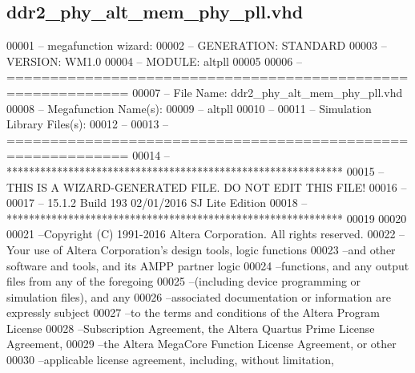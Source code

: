 \subsection{ddr2\+\_\+phy\+\_\+alt\+\_\+mem\+\_\+phy\+\_\+pll.\+vhd}
\label{ddr2__phy__alt__mem__phy__pll_8vhd_source}

\begin{DoxyCode}
00001 \textcolor{keyword}{-- megafunction wizard: %
00002 \textcolor{keyword}{-- GENERATION: STANDARD}
00003 \textcolor{keyword}{-- VERSION: WM1.0}
00004 \textcolor{keyword}{-- MODULE: altpll }
00005 
00006 \textcolor{keyword}{-- ============================================================}
00007 \textcolor{keyword}{-- File Name: ddr2\_phy\_alt\_mem\_phy\_pll.vhd}
00008 \textcolor{keyword}{-- Megafunction Name(s):}
00009 \textcolor{keyword}{--          altpll}
00010 \textcolor{keyword}{--}
00011 \textcolor{keyword}{-- Simulation Library Files(s):}
00012 \textcolor{keyword}{--          }
00013 \textcolor{keyword}{-- ============================================================}
00014 \textcolor{keyword}{-- ************************************************************}
00015 \textcolor{keyword}{-- THIS IS A WIZARD-GENERATED FILE. DO NOT EDIT THIS FILE!}
00016 \textcolor{keyword}{--}
00017 \textcolor{keyword}{-- 15.1.2 Build 193 02/01/2016 SJ Lite Edition}
00018 \textcolor{keyword}{-- ************************************************************}
00019 
00020 
00021 \textcolor{keyword}{--Copyright (C) 1991-2016 Altera Corporation. All rights reserved.}
00022 \textcolor{keyword}{--Your use of Altera Corporation's design tools, logic functions }
00023 \textcolor{keyword}{--and other software and tools, and its AMPP partner logic }
00024 \textcolor{keyword}{--functions, and any output files from any of the foregoing }
00025 \textcolor{keyword}{--(including device programming or simulation files), and any }
00026 \textcolor{keyword}{--associated documentation or information are expressly subject }
00027 \textcolor{keyword}{--to the terms and conditions of the Altera Program License }
00028 \textcolor{keyword}{--Subscription Agreement, the Altera Quartus Prime License Agreement,}
00029 \textcolor{keyword}{--the Altera MegaCore Function License Agreement, or other }
00030 \textcolor{keyword}{--applicable license agreement, including, without limitation, }
}
\end{DoxyCode}
